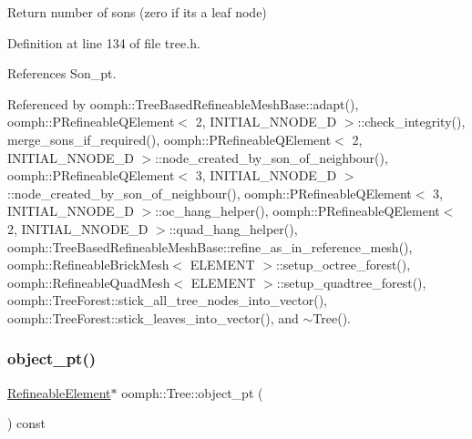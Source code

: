 Return number of sons (zero if it\textquotesingle{}s a leaf node) 



Definition at line 134 of file tree.\+h.



References Son\+\_\+pt.



Referenced by oomph\+::\+Tree\+Based\+Refineable\+Mesh\+Base\+::adapt(), oomph\+::\+P\+Refineable\+Q\+Element$<$ 2, I\+N\+I\+T\+I\+A\+L\+\_\+\+N\+N\+O\+D\+E\+\_\+D $>$\+::check\+\_\+integrity(), merge\+\_\+sons\+\_\+if\+\_\+required(), oomph\+::\+P\+Refineable\+Q\+Element$<$ 2, I\+N\+I\+T\+I\+A\+L\+\_\+\+N\+N\+O\+D\+E\+\_\+D $>$\+::node\+\_\+created\+\_\+by\+\_\+son\+\_\+of\+\_\+neighbour(), oomph\+::\+P\+Refineable\+Q\+Element$<$ 3, I\+N\+I\+T\+I\+A\+L\+\_\+\+N\+N\+O\+D\+E\+\_\+D $>$\+::node\+\_\+created\+\_\+by\+\_\+son\+\_\+of\+\_\+neighbour(), oomph\+::\+P\+Refineable\+Q\+Element$<$ 3, I\+N\+I\+T\+I\+A\+L\+\_\+\+N\+N\+O\+D\+E\+\_\+D $>$\+::oc\+\_\+hang\+\_\+helper(), oomph\+::\+P\+Refineable\+Q\+Element$<$ 2, I\+N\+I\+T\+I\+A\+L\+\_\+\+N\+N\+O\+D\+E\+\_\+D $>$\+::quad\+\_\+hang\+\_\+helper(), oomph\+::\+Tree\+Based\+Refineable\+Mesh\+Base\+::refine\+\_\+as\+\_\+in\+\_\+reference\+\_\+mesh(), oomph\+::\+Refineable\+Brick\+Mesh$<$ E\+L\+E\+M\+E\+N\+T $>$\+::setup\+\_\+octree\+\_\+forest(), oomph\+::\+Refineable\+Quad\+Mesh$<$ E\+L\+E\+M\+E\+N\+T $>$\+::setup\+\_\+quadtree\+\_\+forest(), oomph\+::\+Tree\+Forest\+::stick\+\_\+all\+\_\+tree\+\_\+nodes\+\_\+into\+\_\+vector(), oomph\+::\+Tree\+Forest\+::stick\+\_\+leaves\+\_\+into\+\_\+vector(), and $\sim$\+Tree().

\mbox{\label{classoomph_1_1Tree_a2f2eeb0f1dd161f696cccc652974ff4c}} 
\subsubsection{\texorpdfstring{object\+\_\+pt()}{object\_pt()}}
{\footnotesize\ttfamily \hyperlink{classoomph_1_1RefineableElement}{Refineable\+Element}$\ast$ oomph\+::\+Tree\+::object\+\_\+pt (\begin{DoxyParamCaption}{ }\end{DoxyParamCaption}) const\hspace{0.3cm}{\ttfamily [inline]}}




